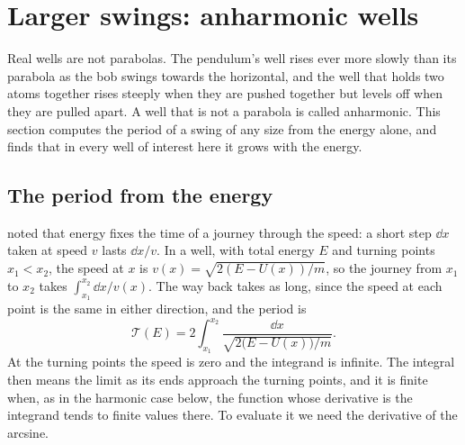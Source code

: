 \section{Larger swings: anharmonic wells}
\label{sec:os-anharmonic}

Real wells are not parabolas. The pendulum's well rises ever more slowly
than its parabola as the bob swings towards the horizontal, and the well that holds two atoms together
rises steeply when they are pushed together but levels off when they are
pulled apart. A well that is not a parabola is called anharmonic. This
section computes the period of a swing of any size from the energy alone,
and finds that in every well of interest here it grows with the energy.

\subsection*{The period from the energy}

 noted that energy fixes the time of a journey through
the speed: a short step $\dd x$ taken at speed $v$ lasts $\dd x/v$. In a
well, with total energy $E$ and turning points $x_1 < x_2$, the speed at
$x$ is $v(x) = \sqrt{2(E - U(x))/m}$, so the journey from $x_1$ to $x_2$
takes $\int_{x_1}^{x_2}\dd x/v(x)$. The way back takes as long, since the
speed at each point is the same in either direction, and the period is
\begin{equation}
   \mathcal{T}(E) = 2\int_{x_1}^{x_2}\frac{\dd x}{\sqrt{2\bigl(E - U(x)\bigr)/m}} .
   \label{eq:os-period}
\end{equation}
At the turning points the speed is zero and the integrand is infinite.
The integral then means the limit as its ends approach the turning
points, and it is finite when, as in the harmonic case below, the
function whose derivative is the integrand tends to finite values there. To evaluate it we need
the derivative of the arcsine.

